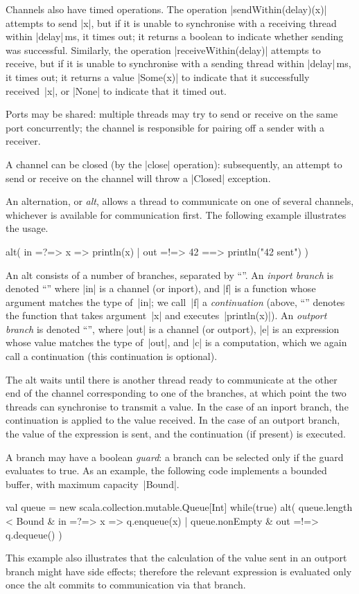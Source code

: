 Channels also have timed operations.  The operation |sendWithin(delay)(x)|
attempts to send |x|, but if it is unable to synchronise with a receiving
thread within |delay|\,ms, it times out; it returns a boolean to indicate
whether sending was successful.  Similarly, the operation
|receiveWithin(delay)| attempts to receive, but if it is unable to synchronise
with a sending thread within |delay|\,ms, it times out; it returns a value
|Some(x)| to indicate that it successfully received~|x|, or |None| to indicate
that it timed out.

Ports may be shared: multiple threads may try to send or receive on the same
port concurrently; the channel is responsible for pairing off a sender with a
receiver. 

A channel can be closed (by the |close| operation): subsequently, an attempt
to send or receive on the channel will throw a |Closed| exception.

An alternation, or \emph{alt}, allows a thread to communicate on one of
several channels, whichever is available for communication first.  The
following example illustrates the usage.
%
\begin{scala}
alt(
  in =?=> { x => println(x) }
  | out =!=> { 42 } ==> { println("42 sent") }
)
\end{scala}
%
An alt consists of a number of branches, separated by ``\SCALA{\|}''.  An
\emph{inport branch} is denoted ``'' where |in| is a channel
(or inport), and |f| is a function whose argument matches the type of~|in|; we
call~|f| a \emph{continuation} (above, ``'' denotes the
function that takes argument~|x| and executes~|println(x)|).  An \emph{outport
  branch} is denoted ``'', where |out| is a channel
(or outport), |e| is an expression whose value matches the type of~|out|, and
|c| is a computation, which we again call a continuation (this continuation is
optional).  

The alt waits until there is another thread ready to communicate at the other
end of the channel corresponding to one of the branches, at which point the
two threads can synchronise to transmit a value.  In the case of an inport
branch, the continuation is applied to the value received.  In the case of an
outport branch, the value of the expression is sent, and the continuation (if
present) is executed.

A branch may have a boolean \emph{guard}: a branch can be selected only if the
guard evaluates to true.  As an example, the following code implements a
bounded buffer, with maximum capacity~|Bound|.
%
\begin{scala}
val queue = new scala.collection.mutable.Queue[Int]
while(true){
  alt(
    queue.length < Bound & in =?=> { x => q.enqueue(x) }
    | queue.nonEmpty & out =!=> { q.dequeue() }
  )    
}
\end{scala}
%
This example also illustrates that the calculation of the value sent in an
outport branch might have side effects; therefore the relevant expression is
evaluated only once the alt commits to communication via that branch.

